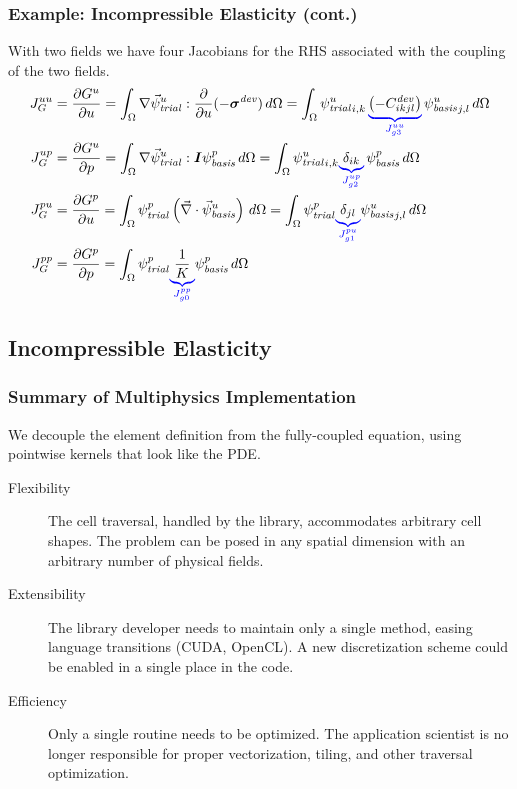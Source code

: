 \documentclass[aspectratio=169]{beamer}
\begin{document}
\begin{frame}
  \frametitle{Example: Incompressible Elasticity (cont.)}
  \summary{}

 With two fields we have four Jacobians for the RHS associated with the coupling of 
the two fields.
\begin{align}
  J_G^{uu} &= \frac{\partial G^u}{\partial u} = \int_\Omega \nabla \trialvec[u] : 
\frac{\partial}{\partial u}(-
\tensor{\sigma}^\mathit{dev}) \, d\Omega 
  = \int_\Omega \trialscalar[u]_{i,k} \, \eqnannotate{\left(-C^\mathit{dev}_{ikjl}\right)}
{J_{g3}^{uu}}  \, 
\basisscalar[u]_{j,l}\, d\Omega \\
  J_G^{up} &= \frac{\partial G^u}{\partial p} = \int_\Omega \nabla\trialvec[u] : \tensor{I} 
\basisscalar[p] \,  d\Omega = \int_\Omega \trialscalar[u]_{i,k} \eqnannotate{\delta_{ik}}{J_{g2}^{up}} \, 
\basisscalar[p] \, d\Omega \\
%
  J_G^{pu} &= \frac{\partial G^p}{\partial u} = \int_\Omega \trialscalar[p] \left(\vec{\nabla} 
\cdot \basisvec[u]\right) \, d\Omega = \int_\Omega \trialscalar[p] \eqnannotate{\delta_{jl}}{J_{g1}^{pu}} 
\basisscalar[u]_{j,l} \, d\Omega\\
  J_G^{pp} &= \frac{\partial G^p}{\partial p} = \int_\Omega \trialscalar[p] \eqnannotate{\frac{1}
{K}}{J_{g0}^{pp}} \basisscalar[p] \, d\Omega
\end{align}

  
\end{frame}


\subsection{Incompressible Elasticity}
\begin{frame}
  \frametitle{Summary of Multiphysics Implementation}
  \summary{}

  We decouple the element definition from the fully-coupled equation,
  using pointwise kernels that look like the PDE.

  \vfill    
  \begin{description}
  \item[Flexibility] The cell traversal, handled by the library,
    accommodates arbitrary cell shapes. The problem can be posed
    in any spatial dimension with an arbitrary number of
    physical fields.
  \item[Extensibility] The library developer needs to maintain only a
    single method, easing language transitions (CUDA, OpenCL). A new
    discretization scheme could be enabled in a single place in the
    code.
  \item[Efficiency] Only a single routine needs to be
    optimized. The application scientist is no longer
    responsible for proper vectorization, tiling, and other
    traversal optimization.
  \end{description}

\end{frame}
\end{document}
